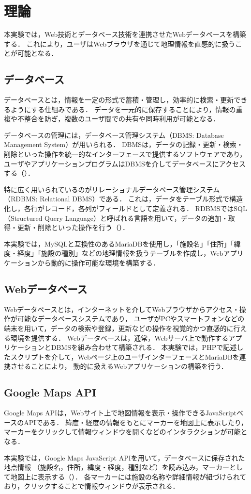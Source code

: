 \section{理論}

本実験では，Web技術とデータベース技術を連携させたWebデータベースを構築する．
これにより，ユーザはWebブラウザを通じて地理情報を直感的に扱うことが可能となる．

\subsection{データベース}

データベースとは，情報を一定の形式で蓄積・管理し，効率的に検索・更新できるようにする仕組みである．
データを一元的に保存することにより，情報の重複や不整合を防ぎ，複数のユーザ間での共有や同時利用が可能となる．

データベースの管理には，データベース管理システム（DBMS: Database Management System）が用いられる．
DBMSは，データの記録・更新・検索・削除といった操作を統一的なインターフェースで提供するソフトウェアであり，
ユーザやアプリケーションプログラムはDBMSを介してデータベースにアクセスする（\cite{mariadb}）．

特に広く用いられているのがリレーショナルデータベース管理システム（RDBMS: Relational DBMS）である．
これは，データをテーブル形式で構造化し，各行がレコード，各列がフィールドとして定義される．
RDBMSではSQL（Structured Query Language）と呼ばれる言語を用いて，データの追加・取得・更新・削除といった操作を行う（\cite{mysql}）．

本実験では，MySQLと互換性のあるMariaDBを使用し，「施設名」「住所」「緯度・経度」「施設の種別」などの地理情報を扱うテーブルを作成し，Webアプリケーションから動的に操作可能な環境を構築する．

\subsection{Webデータベース}

Webデータベースとは，インターネットを介してWebブラウザからアクセス・操作が可能なデータベースシステムであり，
ユーザがPCやスマートフォンなどの端末を用いて，データの検索や登録，更新などの操作を視覚的かつ直感的に行える環境を提供する．
Webデータベースは，通常，Webサーバ上で動作するアプリケーションとDBMSを組み合わせて構築される．
本実験では，PHPで記述したスクリプトを介して，Webページ上のユーザインターフェースとMariaDBを連携させることにより，
動的に扱えるWebアプリケーションの構築を行う．

\subsection{Google Maps API}
Google Maps APIは，Webサイト上で地図情報を表示・操作できるJavaScriptベースのAPIである．
緯度・経度の情報をもとにマーカーを地図上に表示したり，マーカーをクリックして情報ウィンドウを開くなどのインタラクションが可能となる．

本実験では，Google Maps JavaScript APIを用いて，データベースに保存された地点情報
（施設名，住所，緯度・経度，種別など）を読み込み，マーカーとして地図上に表示する（\cite{googleapi}）．
各マーカーには施設の名称や詳細情報が紐づけられており，クリックすることで情報ウィンドウが表示される．
